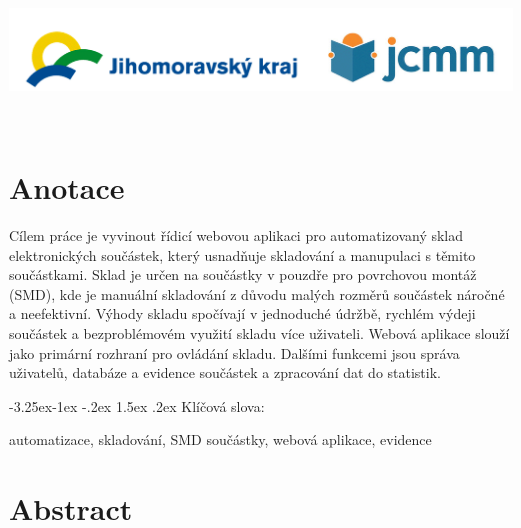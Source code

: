 \documentclass[12pt, a4paper, oneside]{article}
\makeatletter
\renewcommand\paragraph{\@startsection{paragraph}{4}{\z@}%
      {-3.25ex\@plus -1ex \@minus -.2ex}%
      {1.5ex \@plus .2ex}%
      {\normalfont\normalsize\bfseries}}
\makeatother
\begin{document}
\hfill\\[\intextsep]
\begin{minipage}{\textwidth}
\begin{center}
\includegraphics[scale=0.28]{img/loga_podekovani.png}
\end{center}
\end{minipage}
\vspace{2mm}
\normalsize

\newpage   %
~ %
\vspace{10mm}

\section*{Anotace}

Cílem práce je vyvinout řídicí webovou aplikaci pro automatizovaný sklad elektronických součástek, který usnadňuje skladování a manupulaci s těmito součástkami. Sklad je určen na součástky v pouzdře pro povrchovou montáž (SMD), kde je manuální skladování z důvodu malých rozměrů součástek náročné a neefektivní. Výhody skladu spočívají v jednoduché údržbě, rychlém výdeji součástek a bezproblémovém využití skladu více uživateli.
Webová aplikace slouží jako primární rozhraní pro ovládání skladu. Dalšími funkcemi jsou správa uživatelů, databáze a evidence součástek a zpracování dat do statistik.


\paragraph{Klíčová slova:}

automatizace, skladování, SMD součástky, webová aplikace, evidence

\vspace{60mm}
\newpage


\section*{Abstract}
\end{document}

